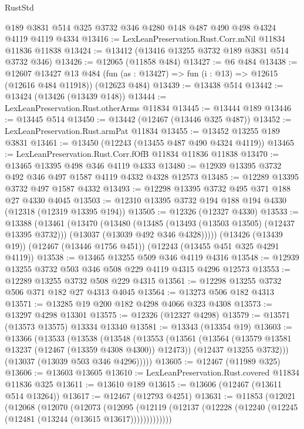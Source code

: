 \begin{lexlean}{RustStd}
\begin{coremodule}
    @189
    @3831
    @514
    @325
    @3732
    @346
    @4280
    @148
    @487
    @490
    @498
    @4324
    @4119
    @4119
    @4334
@13416 := LexLeanPreservation.Rust.Corr.mNil @11834 @11836 @11838
@13424 := @13412 (@13416 @13255 @3732 @189 @3831 @514 @3732 @346)
@13426 := @12065 (@11858 @484)
@13427 := @6 @484
@13438 := @12607
    @13427
    @13
    @484
    (fun (as : @13427) => fun (i : @13) => @12615 (@12616 @484 @11918))
    (@12623 @484)
@13439 := @13438 @514
@13442 := @13424 (@13426 (@13439 @148))
@13444 := LexLeanPreservation.Rust.otherArms @11834
@13445 := @13444 @189
@13446 := @13445 @514
@13450 := @13442 (@12467 (@13446 @325 @487))
@13452 := LexLeanPreservation.Rust.armPat @11834
@13455 := @13452 @13255 @189 @3831
@13461 := @13450 (@12243 (@13455 @487 @490 @4324 @4119))
@13465 := LexLeanPreservation.Rust.Corr.fOfB @11834 @11836 @11838
@13470 := @13465 @13395 @498 @346 @4119 @4333
@13480 := @12939 @13395 @3732 @492 @346 @497 @1587 @4119 @4332 @4328 @12573
@13485 := @12289 @13395 @3732 @497 @1587 @4332
@13493 := @12298 @13395 @3732 @495 @371 @188 @27 @4330 @4045
@13503 := @12310 @13395 @3732 @194 @188 @194 @4330 (@12318 (@12319 @13395 @194))
@13505 := @12326 (@12327 @4330)
@13533 := @13388
    (@13461
      (@13470
        (@13480
          (@13485 (@13493 (@13503 @13505) (@12437 @13395 @3732)))
          (@13037 (@13039 @492 @346 @4328)))))
    (@13426 (@13439 @19))
    (@12467 (@13446 @1756 @451))
    (@12243 (@13455 @451 @325 @4291 @4119))
@13538 := @13465 @13255 @509 @346 @4119 @4316
@13548 := @12939 @13255 @3732 @503 @346 @508 @229 @4119 @4315 @4296 @12573
@13553 := @12289 @13255 @3732 @508 @229 @4315
@13561 := @12298 @13255 @3732 @506 @371 @182 @27 @4313 @4045
@13564 := @13273 @506 @182 @4313
@13571 := @13285 @19 @200 @182 @4298 @4066 @323 @4308
@13573 := @13297 @4298 @13301
@13575 := @12326 (@12327 @4298)
@13579 := @13571 (@13573 @13575) @13334 @13340
@13581 := @13343 (@13354 @19)
@13603 := @13366
    (@13533
      (@13538
        (@13548
          (@13553
            (@13561
              (@13564 (@13579 @13581 @13237 (@12467 (@13359 @4308 @4300)) @12473))
              (@12437 @13255 @3732)))
          (@13037 (@13039 @503 @346 @4296)))))
@13605 := @12467 (@11989 @325)
@13606 := @13603 @13605
@13610 := LexLeanPreservation.Rust.covered @11834 @11836 @325
@13611 := @13610 @189
@13615 := @13606 (@12467 (@13611 @514 @13264))
@13617 := @12467 (@12793 @4251)
@13631 := @11853
    (@12021
      (@12068
        (@12070
          (@12073
            (@12095
              (@12119 (@12137 (@12228 (@12240 (@12245 (@12481 (@13244 (@13615 @13617)))))))))))))

\end{coremodule}
\end{lexlean}
